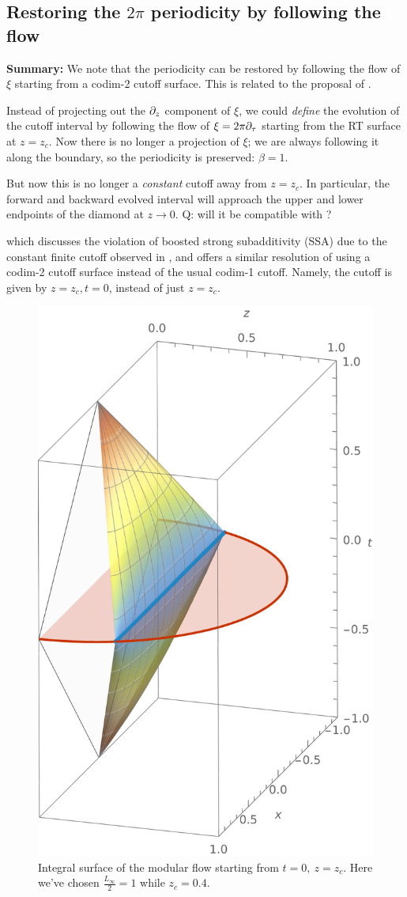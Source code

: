 \documentclass[11pt,a4paper]{article}
\begin{document}
\pagebreak
\subsection{Restoring the $2\pi$ periodicity by following the flow}
	
\textbf{Summary:} We note that the periodicity can be restored by following the flow of $\xi$ starting from a codim-2 cutoff surface. This is related to the proposal of \cite{Grado-White:2020wlb}. 
	
	Instead of projecting out the $\partial_{z}$ component of $\xi$, we could \textit{define} the evolution of the cutoff interval by following the flow of $\xi = 2\pi\partial_{\tau}$ starting from the RT surface at $z = z_c$. Now there is no longer a projection of $\xi$; we are always following it along the boundary, so the periodicity is preserved: $\beta = 1$. 
	
	But now this is no longer a \textit{constant} cutoff away from $z = z_c$. In particular, the forward and backward evolved interval will approach the upper and lower endpoints of the diamond at $z \to 0$. Q: will it be compatible with \textcite{McGough:2016lol}? 
	
	 which discusses the violation of boosted strong subadditivity (SSA) due to the constant finite cutoff observed in \cite{Lewkowycz:2019xse}, and offers a similar resolution of using a codim-2 cutoff surface instead of the usual codim-1 cutoff. Namely, the cutoff is given by $
		z = z_c, t = 0
	$, instead of just $z = z_c$. 
	
	\begin{figure}[!ht]
	\centering
	\includegraphics[width=.35\linewidth]{img/modFlowAnalytic.pdf}
	\caption{Integral surface of the modular flow starting from $t = 0,\ z = z_c$. Here we've chosen $\frac{L_\infty}{2} = 1$ while $z_c = 0.4$.}
	\end{figure}
	
\end{document}
